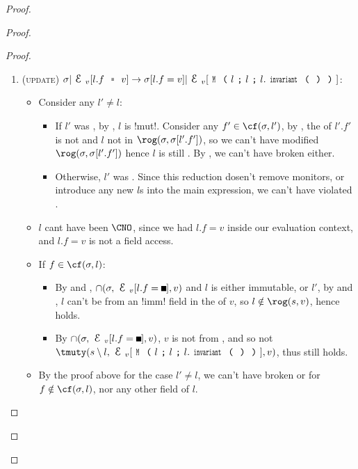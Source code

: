 \begin{Assumption}
\begin{Assumption}
\begin{Assumption}
\begin{proof}
\begin{proof}
\begin{ienumerate}
\begin{enumerate}
\begin{proof}
\begin{enumerate}
\item (\textsc{update}) $\sigma|\EV[l.f\equals{}v]\rightarrow \sigma[l.f=v]|\EV[\M{l}{l}{l.\invariant}]$:
\begin{itemize}
\item Consider any $l' \neq l$:
\begin{itemize}
		\item If $l'$ was \CNE, by , $l$ is \Q!mut!. Consider any $f' \in \cf(\s, l')$, by \CNE, the \rog of $l'.f'$ is not \tmuty and $l$ not in $\rog(\s, \s[l'.f'])$, so we can't have modified $\rog(\s, \s[l'.f'])$ hence $l$ is still \CNC. By , we can't have broken \CNE either.
		\item Otherwise, $l'$ was \CNO. Since this reduction dosen't remove monitors, or introduce any new $l$s into the main expression, we can't have violated \CNO.
\end{itemize}
\item $l$ cant have been $\CNO$, since we had $l.f = v$ inside our evaluation context, and $l.f = v$ is not a field access.
\item If $f \in \cf(\s, l)$:
\begin{itemize} 
\item By  and , $\cap(\s, \EV[l.f = \square], v)$ and $l$ is either immutable, or $l'$, by  and , $l$ can't be \reach from an \Q!imm! field in the \rog of $v$, so $l\notin \rog(s, v)$, hence \CNC holds.
\item By $\cap(\s, \EV[l.f = \square], v)$, $v$ is not \tmuty from \EV, and so not $\tmuty(s\setminus l, \EV[\M{l}{l}{l.\invariant}], v)$, thus \CNE still holds.
\end{itemize}
\item By the proof above for the case $l' \neq l$, we can't have broken \CNE or \CNC for $f \notin \cf(\s, l)$, nor any other field of $l$.
\end{itemize}



\end{enumerate}
\end{proof}
\end{enumerate}
\end{ienumerate}
\end{proof}
\end{proof}
\end{Assumption}
\end{Assumption}
\end{Assumption}
